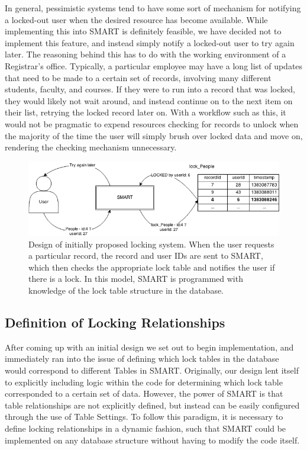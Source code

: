 \documentclass[12pt]{article}
\begin{document}
In general, pessimistic systems tend to have some sort of mechanism for notifying a locked-out user when the desired resource has become available. While implementing this into SMART is definitely feasible, we have decided not to implement this feature, and instead simply notify a locked-out user to try again later. The reasoning behind this has to do with the working environment of a Registrar's office. Typically, a particular employee may have a long list of updates that need to be made to a certain set of records, involving many different students, faculty, and courses. If they were to run into a record that was locked, they would likely not wait around, and instead continue on to the next item on their list, retrying the locked record later on. With a workflow such as this, it would not be pragmatic to expend resources checking for records to unlock when the majority of the time the user will simply brush over locked data and move on, rendering the checking mechanism unnecessary.

\begin{center}
\begin{figure}[h]
    \centering
    \centerline{\includegraphics[width=7in]{diagrams/InitialLockDesign.png}}
    \begin{spacing}{1.0}\caption{Design of initially proposed locking system. When the user requests a particular record, the record and user IDs are sent to SMART, which then checks the appropriate lock table and notifies the user if there is a lock. In this model, SMART is programmed with knowledge of the lock table structure in the database.}\end{spacing}
\end{figure}
\end{center}

\subsection{Definition of Locking Relationships}

After coming up with an initial design we set out to begin implementation, and immediately ran into the issue of defining which lock tables in the database would correspond to different Tables in SMART. Originally, our design lent itself to explicitly including logic within the code for determining which lock table corresponded to a certain set of data. However, the power of SMART is that table relationships are not explicitly defined, but instead can be easily configured through the use of Table Settings. To follow this paradigm, it is necessary to define locking relationships in a dynamic fashion, such that SMART could be implemented on any database structure without having to modify the code itself.
\end{document}
